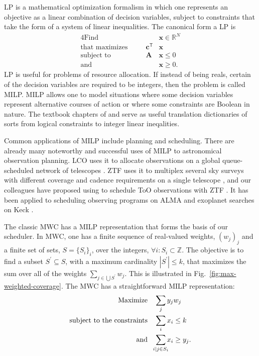 \documentclass[twocolumn,times]{aastex631}
\begin{document}
\Ac{LP} is a mathematical optimization formalism in which one represents an objective as a linear combination of decision variables, subject to constraints that take the form of a system of linear inequalities. The canonical form a \ac{LP} is
%
\begin{alignat*}{4}
    \text{Find}\quad && &\mathbf{x} \in \mathbb{R}^N \\
    \text{that maximizes}\quad && \mathbf{c}^\mathsf{T} &\mathbf{x} \\
    \text{subject to}\quad && \mathbf{A} &\mathbf{x} \leq 0 \\
    \text{and}\quad && &\mathbf{x} \geq 0.
\end{alignat*}
%
\ac{LP} is useful for problems of resource allocation. If instead of being reals, certain of the decision variables are required to be integers, then the problem is called \acf{MILP}. \ac{MILP} allows one to model situations where some decision variables represent alternative courses of action or where some constraints are Boolean in nature. The textbook chapters of \citet{9781118166000.ch3} and \citet{williams2013model} serve as useful translation dictionaries of sorts from logical constraints to integer linear ineqalities.

Common applications of \ac{MILP} include planning and scheduling. There are already many noteworthy and successful uses of \ac{MILP} to astronomical observation planning. \ac{LCO} uses it to allocate observations on a global queue-scheduled network of telescopes \citep{2014SPIE.9149E..0ES}. \ac{ZTF} uses it to multiplex several sky surveys with different coverage and cadence requirements on a single telescope \citep{2019PASP..131f8003B}, and our colleagues have proposed using to schedule \ac{ToO} observations with \ac{ZTF} \citep{2022ApJ...935...87P}. It has been applied to scheduling observing programs on \ac{ALMA} \citep{2016A&C....15...90S} and exoplanet searches on Keck \citep{2024AJ....167...33H}.

The classic \ac{MWC} has a \ac{MILP} representation that forms the basis of our scheduler. In \ac{MWC}, one has a finite sequence of real-valued weights, $(w_j)_j$ and a finite set of sets, $S = \{S_i\}_i$, over the integers, $\forall i: S_i \subset \mathbb{Z}$. The objective is to find a subset $S^\prime \subseteq S$, with a maximum cardinality $|S^\prime| \leq k$, that maximizes the sum over all of the weights $\sum_{j \in \bigcup S^\prime} w_j$. This is illustrated in Fig.~\ref{fig:max-weighted-coverage}. The \ac{MWC} has a straightforward \ac{MILP} representation:
%
\begin{align*}
\text{Maximize}\quad &\sum_j y_j w_j \\
\text{subject to the constraints}\quad &\sum_i x_i \leq k \\
\text{and}\quad &\sum_{\mathclap{i \mid j \in S_i}} x_i \geq y_j.
\end{align*}
\end{document}
